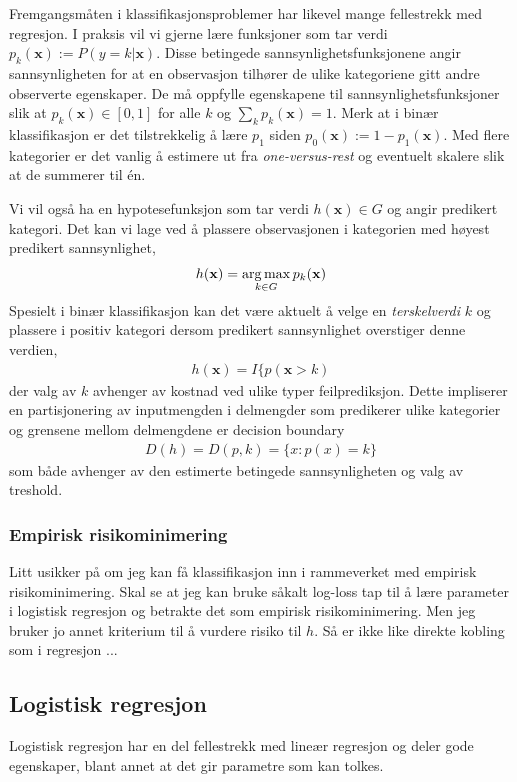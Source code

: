 Fremgangsmåten i klassifikasjonsproblemer har likevel mange fellestrekk med regresjon. I praksis vil vi gjerne lære funksjoner som tar verdi $p_k(\mathbf{x}) := P(y=k|\mathbf{x})$. Disse betingede sannsynlighetsfunksjonene angir sannsynligheten for at en observasjon tilhører de ulike kategoriene gitt andre observerte egenskaper. De må oppfylle egenskapene til sannsynlighetsfunksjoner slik at $p_k(\mathbf{x}) \in [0,1]$ for alle $k$ og $\sum_k p_k(\mathbf{x})=1$. Merk at i binær klassifikasjon er det tilstrekkelig å lære $p_1$ siden $p_0(\mathbf{x}):=1-p_1(\mathbf{x})$. Med flere kategorier er det vanlig å estimere ut fra \textit{one-versus-rest} og eventuelt skalere slik at de summerer til én. 

Vi vil også ha en hypotesefunksjon som tar verdi $h(\mathbf{x})\in G$ og angir predikert kategori. Det kan vi lage ved å plassere observasjonen i kategorien med høyest predikert sannsynlighet,
\begin{align}
h(\mathbf{x}) = \operatorname*{arg\,max}_{k\in G} p_k(\mathbf{x})
\end{align}
Spesielt i binær klassifikasjon kan det være aktuelt å velge en \textit{terskelverdi} $k$ og plassere i positiv kategori dersom predikert sannsynlighet overstiger denne verdien,
\begin{align}
h(\mathbf{x}) = I\{p(\mathbf{x}>k)
\end{align}
der valg av $k$ avhenger av kostnad ved ulike typer feilprediksjon. Dette impliserer en partisjonering av inputmengden i delmengder som predikerer ulike kategorier og grensene mellom delmengdene er decision boundary
\begin{align}
D(h)=D(p,k)=\{x:p(x)=k\}
\end{align}
som både avhenger av den estimerte betingede sannsynligheten og valg av treshold.
\subsubsection{Empirisk risikominimering}
Litt usikker på om jeg kan få klassifikasjon inn i rammeverket med empirisk risikominimering. Skal se at jeg kan bruke såkalt log-loss tap til å lære parameter i logistisk regresjon og betrakte det som empirisk risikominimering. Men jeg bruker jo annet kriterium til å vurdere risiko til $h$. Så er ikke like direkte kobling som i regresjon ...
\subsection{Logistisk regresjon}
Logistisk regresjon har en del fellestrekk med lineær regresjon og deler gode egenskaper, blant annet at det gir parametre som kan tolkes.

